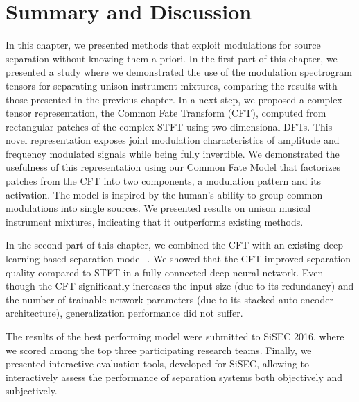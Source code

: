 \section{Summary and Discussion}


In this chapter, we presented methods that exploit modulations for source separation without knowing them a priori. 
In the first part of this chapter, we presented a study where we demonstrated the use of the modulation spectrogram tensors for separating unison instrument mixtures, comparing the results with those presented in the previous chapter.
In a next step, we proposed a complex tensor representation, the Common Fate Transform (CFT), computed from rectangular patches of the complex STFT using two-dimensional DFTs.
This novel representation exposes joint modulation characteristics of amplitude and frequency modulated signals while being fully invertible.
We demonstrated the usefulness of this representation using our Common Fate Model that factorizes patches from the CFT into two components, a modulation pattern and its activation. 
The model is inspired by the human's ability to group common modulations into single sources.
We presented results on unison musical instrument mixtures, indicating that it outperforms existing methods.
\par
In the second part of this chapter, we combined the CFT with an existing deep learning based separation model~\cite{uhlich15}.
We showed that the CFT improved separation quality compared to STFT in a fully connected deep neural network.
Even though the CFT significantly increases the input size (due to its redundancy) and the number of trainable network parameters (due to its stacked auto-encoder architecture), generalization performance did not suffer.
\par
The results of the best performing model were submitted to SiSEC 2016, where we scored among the top three participating research teams.
Finally, we presented interactive evaluation tools, developed for SiSEC, allowing to interactively assess the performance of separation systems both objectively and subjectively.